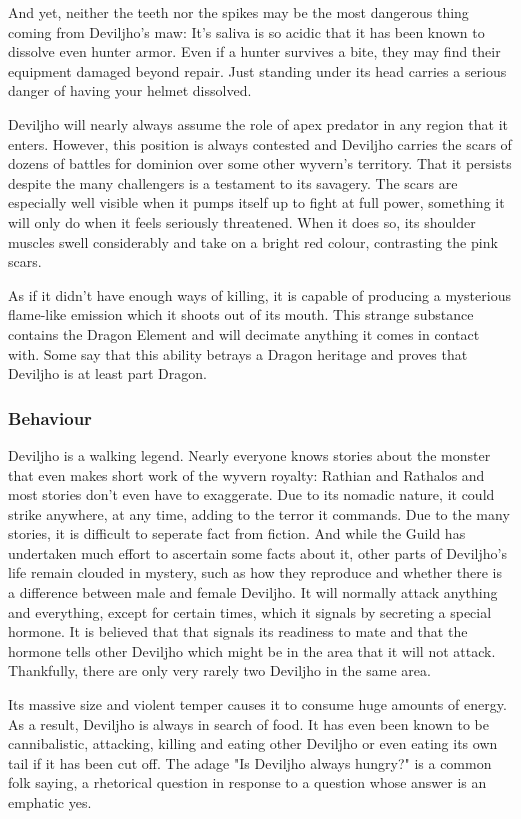 And yet, neither the teeth nor the spikes may be the most dangerous thing coming from Deviljho's maw: It's saliva is so acidic that it has been known to dissolve even hunter armor. Even if a hunter survives a bite, they may find their equipment damaged beyond repair. Just standing under its head carries a serious danger of having your helmet dissolved.

Deviljho will nearly always assume the role of apex predator in any region that it enters. However, this position is always contested and Deviljho carries the scars of dozens of battles for dominion over some other wyvern's territory. That it persists despite the many challengers is a testament to its savagery. The scars are especially well visible when it pumps itself up to fight at full power, something it will only do when it feels seriously threatened. When it does so, its shoulder muscles swell considerably and take on a bright red colour, contrasting the pink scars.

As if it didn't have enough ways of killing, it is capable of producing a mysterious flame-like emission which it shoots out of its mouth. This strange substance contains the Dragon Element and will decimate anything it comes in contact with. Some say that this ability betrays a Dragon heritage and proves that Deviljho is at least part Dragon.

\subsubsection{Behaviour}
Deviljho is a walking legend. Nearly everyone knows stories about the monster that even makes short work of the wyvern royalty: Rathian and Rathalos and most stories don't even have to exaggerate. Due to its nomadic nature, it could strike anywhere, at any time, adding to the terror it commands. Due to the many stories, it is difficult to seperate fact from fiction. And while the Guild has undertaken much effort to ascertain some facts about it, other parts of Deviljho's life remain clouded in mystery, such as how they reproduce and whether there is a difference between male and female Deviljho. It will normally attack anything and everything, except for certain times, which it signals by secreting a special hormone. It is believed that that signals its readiness to mate and that the hormone tells other Deviljho which might be in the area that it will not attack. Thankfully, there are only very rarely two Deviljho in the same area.

Its massive size and violent temper causes it to consume huge amounts of energy. As a result, Deviljho is always in search of food. It has even been known to be cannibalistic, attacking, killing and eating other Deviljho or even eating its own tail if it has been cut off. The adage "Is Deviljho always hungry?" is a common folk saying, a rhetorical question in response to a question whose answer is an emphatic yes.

